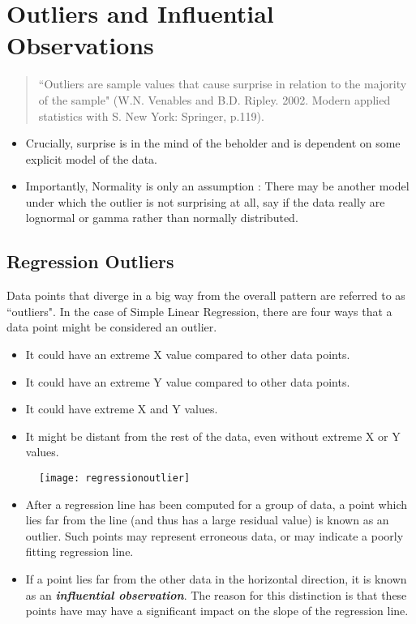 \documentclass[residuals.tex]{subfiles}
\begin{document}
\Large
\section{Outliers and Influential Observations}
\begin{quote}
	``Outliers are sample values that cause surprise in relation to the majority of the sample" (W.N. Venables and B.D. Ripley. 2002. Modern applied statistics with S. New York: Springer, p.119).
\end{quote}
\begin{itemize}
\item Crucially, surprise is in the mind of the beholder and is dependent on some explicit model of the data. 

\item Importantly, Normality is only an assumption : There may be another model under which the outlier is not surprising at all, say if the data really are lognormal or 
gamma rather than normally distributed. 
\end{itemize}

\subsection{Regression Outliers}

Data points that diverge in a big way from the overall pattern are referred to as ``outliers".
In the case of Simple Linear Regression, there are four ways that a data point might be considered an outlier.
\begin{framed}
\begin{itemize}
	\item It could have an extreme X value compared to other data points.
	\item It could have an extreme Y value compared to other data points.
	\item It could have extreme X and Y values.
	\item It might be distant from the rest of the data, even without extreme X or Y values.
\end{itemize}
\end{framed}
\begin{figure}[h!]
\centering
\texttt{[image: regressionoutlier]}
\end{figure}

\begin{itemize}
\item After a regression line has been computed for a group of data, a point which lies far from the line 
(and thus has a large residual value) is known as an outlier. 
Such points may represent erroneous data, or may indicate a poorly fitting regression line. 

\item If a point lies far from the other data in the horizontal direction, it is known as an \textit{\textbf{influential observation}}. 
The reason for this distinction is that these points have may have a significant impact on the slope of the regression line.
\end{itemize}
\end{document}
